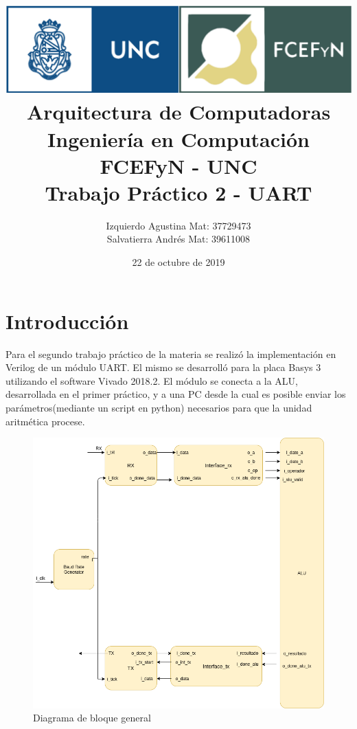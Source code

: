 \documentclass[a4paper]{article}
\begin{document}
\title{%
\includegraphics[scale = 0.5]{./header_unc.png}\\[1.0 cm]	%
  Arquitectura de Computadoras \\
  \large Ingeniería en Computación FCEFyN - UNC\\
  		Trabajo Práctico 2 - UART
  }


  \author{Izquierdo Agustina Mat: 37729473\\
          Salvatierra Andrés Mat: 39611008}
  
  \date{22 de octubre de 2019}
\maketitle
\newpage

\section{Introducción}
Para el segundo trabajo práctico de la materia se realizó la implementación en Verilog de un módulo UART. 
El mismo se desarrolló para la placa Basys 3 utilizando el software Vivado 2018.2.
El módulo se conecta a la ALU, desarrollada en el primer práctico, y a una PC desde la cual es posible enviar los parámetros(mediante un script en python) necesarios para que la unidad aritmética procese.

\begin{figure}[!htb]
\centering
\includegraphics[width=.95\textwidth]{bloque_gral.png}
\caption{\label{fig:tp2_uart}Diagrama de bloque general}
\end{figure}
\end{document}
